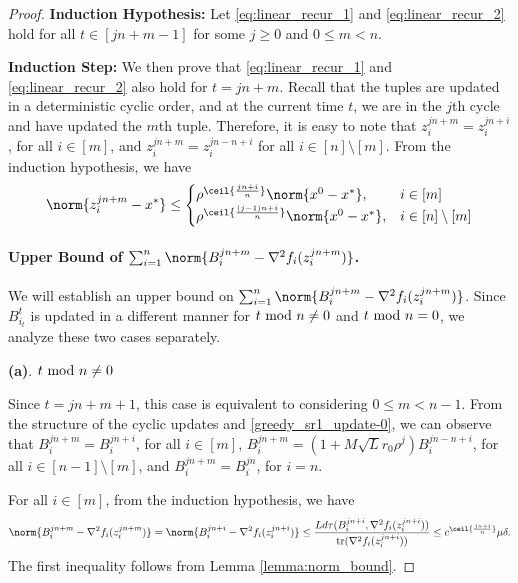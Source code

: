 \begin{proof}
    \textbf{Induction Hypothesis:} Let \eqref{eq:linear_recur_1} and \eqref{eq:linear_recur_2} hold for all $t \in [jn + m - 1]$ for some $j \geq 0$ and $0 \leq m < n$.
    
    \textbf{Induction Step:} We then prove that \eqref{eq:linear_recur_1} and \eqref{eq:linear_recur_2} also hold for $t = jn + m$. Recall that the tuples are updated in a deterministic cyclic order, and at the current time $t$, we are in the $j$th cycle and have updated the $m$th tuple. Therefore, it is easy to note that $z_i^{j n + m} = z_i^{j n + i}$, for all $i \in [m]$, and $z_{i}^{j n + m} = z_i^{j n - n + i}$ for all $i \in [n] \setminus [m]$. From the induction hypothesis, we have
    \begin{equation*}
        \norm{z_i^{j n + m} - x^*} \leq 
        \begin{cases}
            \rho^{\ceil{\frac{j n + i}{n}}} \norm{x^0 - x^*}, & i\in[m] \\
            \rho^{\ceil{\frac{(j - 1) n + i}{n}}} \norm{x^0 - x^*}, & i\in[n] \setminus [m]
        \end{cases}
    \end{equation*}

    \paragraph{Upper Bound of $\sum_{i=1}^n \norm{B_i^{j n + m} - \nabla^2 f_i(z_i^{j n + m})}$.}
    We will establish an upper bound on $\sum_{i=1}^n \norm{B_i^{j n + m} - \nabla^2 f_i(z_i^{j n + m})}$. 
    Since $B_{i_t}^t$ is updated in a different manner for $t~{\rm mod}~n \neq 0$ and $t~{\rm mod}~n = 0$, we analyze these two cases separately.

    \textbf{(a)}. $t~{\rm mod}~n \neq 0$

    Since $t = j n + m + 1$, this case is equivalent to considering $0 \leq m < n - 1$. From the structure of the cyclic updates and \eqref{greedy_sr1_update-0}, we can observe that $B_i^{j n + m} = B_i^{j n + i}$, for all $i \in [m]$, $B_i^{j n + m} = (1 + M \sqrt{L} r_0 \rho^j) B_i^{j n - n + i}$, for all $i \in [n-1] \setminus [m]$, and $B_i^{jn + m} = B_i^{j n}$, for $i = n$.

    For all $i \in [m]$, from the induction hypothesis, we have
    \begin{equation*}
        \norm{B_i^{j n + m} - \nabla^2 f_i (z_i^{j n + m})} = \norm{B_i^{j n + i} - \nabla^2 f_i (z_i^{j n + i})} \leq \frac{L d \tau(B_i^{j n + i}, \nabla^2 f_i (z_i^{j n + i}))}{\mathrm{tr}(\nabla^2 f_i (z_i^{j n + i}))} \leq c^{\ceil{\frac{j n + i}{n}}}\mu \delta .
    \end{equation*}
    The first inequality follows from Lemma \ref{lemma:norm_bound}. 


\end{proof}
